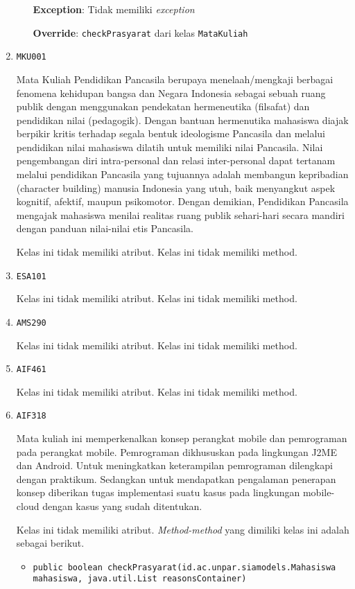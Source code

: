 \documentclass{article}
\begin{document}
\begin{enumerate}
\begin{itemize}
\textbf{Exception}: Tidak memiliki \textit{exception}

\textbf{Override}: \texttt{checkPrasyarat} dari kelas \texttt{MataKuliah}

\end{itemize}
\item \texttt{MKU001}

Mata Kuliah Pendidikan Pancasila berupaya menelaah/mengkaji berbagai fenomena kehidupan 
 bangsa dan Negara Indonesia sebagai sebuah ruang publik dengan menggunakan pendekatan 
 hermeneutika (filsafat) dan pendidikan nilai (pedagogik). Dengan bantuan hermenutika
 mahasiswa diajak berpikir kritis terhadap segala bentuk ideologisme Pancasila dan melalui 
 pendidikan nilai mahasiswa dilatih untuk memiliki nilai Pancasila. Nilai pengembangan diri 
 intra-personal dan relasi inter-personal dapat tertanam melalui pendidikan Pancasila yang 
 tujuannya adalah membangun kepribadian (character building) manusia Indonesia yang utuh, 
 baik menyangkut aspek kognitif, afektif, maupun psikomotor. Dengan demikian, Pendidikan 
 Pancasila mengajak mahasiswa menilai realitas ruang publik sehari-hari secara mandiri 
 dengan panduan nilai-nilai etis Pancasila.

Kelas ini tidak memiliki atribut. Kelas ini tidak memiliki method. \item \texttt{ESA101}



Kelas ini tidak memiliki atribut. Kelas ini tidak memiliki method. \item \texttt{AMS290}



Kelas ini tidak memiliki atribut. Kelas ini tidak memiliki method. \item \texttt{AIF461}



Kelas ini tidak memiliki atribut. Kelas ini tidak memiliki method. \item \texttt{AIF318}

Mata kuliah ini memperkenalkan konsep perangkat mobile dan pemrograman pada perangkat 
 mobile. Pemrograman dikhususkan pada lingkungan J2ME dan Android.
 Untuk meningkatkan keterampilan pemrograman dilengkapi dengan praktikum. 
 Sedangkan untuk mendapatkan pengalaman penerapan konsep diberikan tugas implementasi suatu 
 kasus pada lingkungan mobile-cloud dengan kasus yang sudah ditentukan.

Kelas ini tidak memiliki atribut. \textit{Method-method} yang dimiliki kelas ini adalah sebagai berikut.
\begin{itemize}
\item \texttt{public boolean checkPrasyarat(id.ac.unpar.siamodels.Mahasiswa mahasiswa, java.util.List reasonsContainer)}


\end{itemize}
\end{enumerate}
\end{document}
